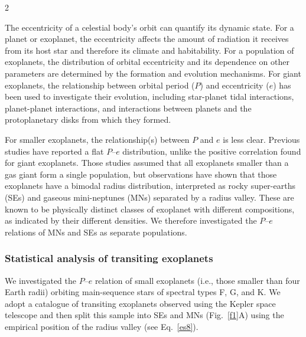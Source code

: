 \documentclass[10pt]{article}
\begin{document}
\clearpage
\begin{multicols}{2}


\noindent The eccentricity of a celestial body's orbit can quantify its dynamic state.
For a planet or exoplanet, the eccentricity affects the amount of radiation it receives from its host star and therefore its climate and habitability\cite{2002IJAsB...1...61W,2010ApJ...721.1295D,2016A&A...591A.106B}.
For a population of exoplanets, the distribution of orbital eccentricity and its dependence on other parameters are determined by the formation and evolution mechanisms\cite{2013ApJ...767L..24D,2015PNAS..112...20L,2023PNAS..12017398S}.
For giant exoplanets, the relationship between orbital period ($P$) and eccentricity ($e$) has been used to investigate their evolution\cite{2005A&A...431.1129H,2018ARA&A..56..175D}, including star-planet tidal interactions\cite{2008ApJ...678.1396J}, planet-planet interactions\cite{2008ApJ...686..621F,2008ApJ...686..580C}, and interactions between planets and the protoplanetary disks from which they formed\cite{2003ApJ...585.1024G,2013ApJ...769...26C}.

For smaller exoplanets, the relationship(s) between $P$ and $e$ is less clear.
Previous studies have reported a flat $P$--$e$ distribution\cite{2020A&A...635A..37C,2024AJ....168..115B}, unlike the positive correlation found for giant exoplanets\cite{2005A&A...431.1129H,2024AJ....168..115B}.
Those studies assumed that all exoplanets smaller than a gas giant form a single population, but observations have shown that those exoplanets have a bimodal radius distribution, interpreted as rocky super-earths (SEs) and gaseous mini-neptunes (MNs) separated by a radius valley\cite{2017AJ....154..109F}.
These are known to be physically distinct classes of exoplanet with different compositions, as indicated by their different densities\cite{2019PNAS..116.9723Z,2022Sci...377.1211L}.
We therefore investigated the $P$--$e$ relations of MNs and SEs as separate populations.

\subsubsection*{Statistical analysis of transiting exoplanets}
\noindent We investigated the $P$--$e$ relation of small exoplanets (i.e., those smaller than four Earth radii) orbiting main-sequence stars of spectral types F, G, and K\cite{methods}.
We adopt a catalogue of transiting exoplanets observed using the Kepler space telescope\cite{methods,2018ApJS..235...38T,KDR25} and then split this sample into SEs and MNs (Fig.~\ref{f1}A) using the empirical position of the radius valley (see Eq.~\ref{es8}).


\end{multicols}
\end{document}
